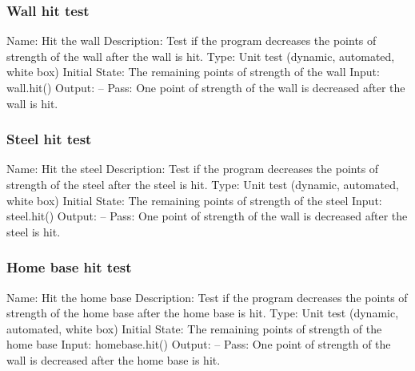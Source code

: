 \documentclass{article}
\begin{document}
\subsubsection{Wall hit test}
Name:  Hit the wall\newline
Description: Test if the program decreases the points of strength of the wall after the wall is hit. \newline
Type: Unit test (dynamic, automated, white box) \newline
Initial State:  The remaining points of strength of the wall\newline
Input: wall.hit()\newline
Output: --\newline
Pass:  One point of strength of the wall is decreased after the wall is hit. \newline

\subsubsection{Steel hit test}
Name:  Hit the steel\newline
Description: Test if the program decreases the points of strength of the steel after the steel is hit. \newline
Type: Unit test (dynamic, automated, white box) \newline
Initial State:  The remaining points of strength of the steel\newline
Input: steel.hit()\newline
Output: --\newline
Pass:  One point of strength of the wall is decreased after the steel is hit. \newline

\subsubsection{Home base hit test}
Name:  Hit the home base\newline
Description: Test if the program decreases the points of strength of the home base after the home base is hit. \newline
Type: Unit test (dynamic, automated, white box) \newline
Initial State:  The remaining points of strength of the home base\newline
Input: homebase.hit()\newline
Output: --\newline
Pass:  One point of strength of the wall is decreased after the home base is hit. \newline
\end{document}
